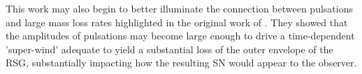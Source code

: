 This work may also begin to better illuminate the connection between
pulsations and large mass loss rates highlighted in the original work of \citet{Yoon_2010}. 
They showed that the amplitudes of pulsations may become large enough to drive a time-dependent
'super-wind' adequate to yield a substantial loss of the outer
envelope of the RSG, substantially impacting how the resulting SN would appear to the observer. 